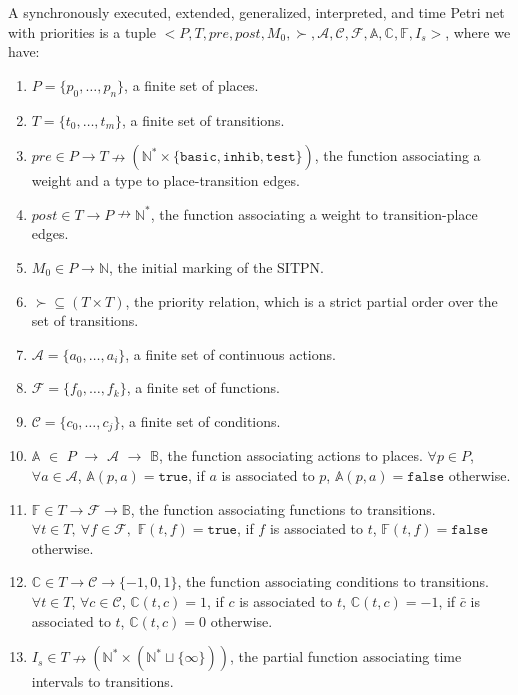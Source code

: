 \begin{definition}[SITPN]
  \label{def:sitpn}
  A synchronously executed, extended, generalized, interpreted, and
  time Petri net with priorities is a tuple
  ${<}P,T,pre,post,M_0,{\succ},\mathcal{A},\mathcal{C},\mathcal{F},
  \mathbb{A},\mathbb{C},\mathbb{F},{I_s}{>}$, where we have:
  \begin{enumerate}
  \item $P=\{p_0,\ldots,p_n\}$, a finite set of places.
  \item $T=\{t_0,\ldots,t_m\}$, a finite set of transitions.
  \item
    $pre\in{}P\rightarrow{}T\nrightarrow(\mathbb{N}^{*}\times\{\mathtt{basic},\mathtt{inhib},\mathtt{test}\})$,
    the function associating a weight and a type to place-transition
    edges.
  \item $post\in{}T\rightarrow{}P\nrightarrow\mathbb{N}^{*}$, the
    function associating a weight to transition-place edges.
  \item $M_0\in{}P\rightarrow\mathbb{N}$, the initial marking of the SITPN.
  \item $\succ\subseteq{}(T\times{}T)$, the priority relation, which
    is a strict partial order over the set of transitions.
  \item $\mathcal{A}=\{a_0,\ldots,a_i\}$, a finite set of continuous actions.
  \item $\mathcal{F}=\{f_0,\ldots,f_k\}$, a finite set of functions.
  \item $\mathcal{C}=\{c_0,\ldots,c_j\}$, a finite set of conditions.
  \item $\mathbb{A}$ $\in$ ${}P$ $\rightarrow$ $\mathcal{A}$
    $\rightarrow$ $\mathbb{B}$, the function associating actions to
    places.  $\forall{}p\in{}P$, $\forall{}a\in\mathcal{A}$,
    $\mathbb{A}(p,a)=\mathtt{true}$, if $a$ is associated to $p$,
    $\mathbb{A}(p,a)=\mathtt{false}$ otherwise.
  \item $\mathbb{F}\in{}T\rightarrow\mathcal{F}\rightarrow\mathbb{B}$,
    the function associating functions to transitions.
    $\forall{}t\in{}T,~\forall{}f\in\mathcal{F},$
    $\mathbb{F}(t,f)=\mathtt{true}$, if $f$ is associated to $t$,
    $\mathbb{F}(t,f)=\mathtt{false}$ otherwise.
    
  \item $\mathbb{C} \in T \rightarrow \mathcal{C} \rightarrow\{-1,0,1\}$, the
    function associating conditions to transitions.
    $\forall t \in T$, $\forall c \in \mathcal{C}$,
    $\mathbb{C}(t,c)=1$, if $c$ is associated to $t$,
    $\mathbb{C}(t,c)=-1$, if $\bar{c}$ is associated to $t$,
    $\mathbb{C}(t,c)=0$ otherwise.
  \item
    $I_s\in{}T\nrightarrow(\mathbb{N}^{*}\times(\mathbb{N^{*}}\sqcup\{\infty\}))$,
    the partial function associating time intervals to transitions.
  \end{enumerate}
\end{definition}


